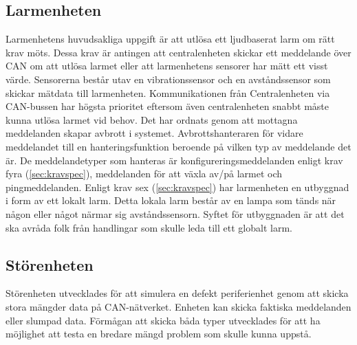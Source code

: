 \subsection{Larmenheten}
\label{sec:LarmenhetenDE}
Larmenhetens huvudsakliga uppgift är att utlösa ett ljudbaserat larm om rätt krav möts. Dessa krav är antingen att centralenheten skickar ett meddelande över CAN om att utlösa larmet eller att larmenhetens sensorer har mätt ett visst värde. Sensorerna består utav en vibrationssensor  och en avståndssensor som skickar mätdata till larmenheten.
\newline\newline
Kommunikationen från Centralenheten via CAN-bussen har högsta prioritet eftersom även centralenheten snabbt måste kunna utlösa larmet vid behov. Det har ordnats genom att mottagna meddelanden skapar avbrott i systemet. Avbrottshanteraren för vidare meddelandet till en hanteringsfunktion beroende på vilken typ av meddelande det är. De meddelandetyper som hanteras är konfigureringsmeddelanden enligt krav fyra (\ref{sec:kravspec}), meddelanden för att växla av/på larmet och pingmeddelanden. 
\newline\newline
Enligt krav sex (\ref{sec:kravspec}) har larmenheten en utbyggnad i form av ett lokalt larm. Detta lokala larm består av en lampa som tänds när någon eller något närmar sig avståndssensorn. Syftet för utbyggnaden är att det ska avråda folk från handlingar som skulle leda till ett globalt larm. \\

\subsection{Störenheten}
\label{sec:störenhetenDE}
Störenheten utvecklades för att simulera en defekt periferienhet genom att skicka stora mängder data på CAN-nätverket. Enheten kan skicka faktiska meddelanden eller slumpad data. Förmågan att skicka båda typer utvecklades för att ha möjlighet att testa en bredare mängd problem som skulle kunna uppstå.

